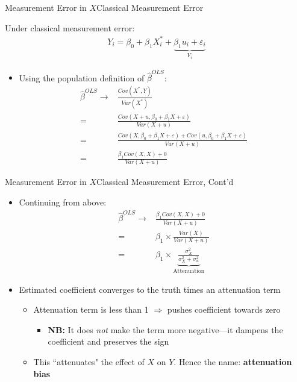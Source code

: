 \documentclass[aspectratio=169,11pt]{beamer}
\begin{document}
\begin{frame}{Measurement Error in $X$}{Classical Measurement Error}

Under classical measurement error:
	\begin{align*}
		Y_i = \beta_0 + \beta_1 X_i^* + \underbrace{\beta_1u_i + \varepsilon_i}_{V_i}
	\end{align*}
\begin{itemize}
	\item Using the population definition of $\hat\beta^{OLS}$:{\small
		\begin{align*}
			\hat\beta^{OLS}\to & \frac{Cov(X^*,Y)}{Var(X^*)}\\
							=&\frac{Cov(X+u,\beta_0 + \beta_1 X + \varepsilon)}{Var(X+u)}\\
							=&\frac{Cov(X,\beta_0 + \beta_1 X + \varepsilon) + Cov(u,\beta_0 + \beta_1 X + \varepsilon)}{Var(X+u)}\\
							=& \frac{\beta_1 Cov(X,X) + 0}{Var(X+u)}
		\end{align*}}
\end{itemize}
	
	
\end{frame}

\begin{frame}{Measurement Error in $X$}{Classical Measurement Error, Cont'd}

\begin{itemize}
	\item Continuing from above:{\small
		\begin{align*}
			\hat\beta^{OLS}\to & \frac{\beta_1 Cov(X,X) + 0}{Var(X+u)}\\
							=& \beta_1\times\frac{Var(X)}{Var(X+u)}\\
							=& \beta_1\times\underbrace{\frac{\sigma^2_X}{\sigma^2_X + \sigma^2_u}}_{\text{Attenuation}}
		\end{align*}}
	\item Estimated coefficient converges to the truth times an attenuation term
		\begin{itemize}
			\item Attenuation term is less than 1 $\Rightarrow$ pushes coefficient towards zero
			\begin{itemize}
			\item {\bf NB:} It does \emph{not} make the term more negative---it dampens the coefficient and preserves the sign
			\end{itemize}
			\item This ``attenuates" the effect of $X$ on $Y$. Hence the name: {\bf attenuation bias}
		\end{itemize}
		
\end{itemize}
	
	
\end{frame}
\end{document}
